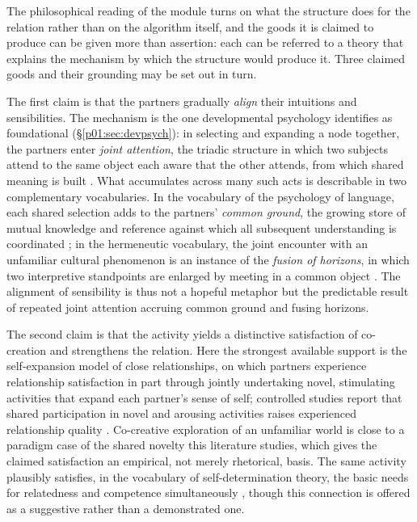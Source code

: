 \documentclass[11pt,a4paper]{article}
\begin{document}
The philosophical reading of the module turns on what the structure does for the relation rather than on the algorithm itself, and the goods it is claimed to produce can be given more than assertion: each can be referred to a theory that explains the mechanism by which the structure would produce it. Three claimed goods and their grounding may be set out in turn.

The first claim is that the partners gradually \emph{align} their intuitions and sensibilities. The mechanism is the one developmental psychology identifies as foundational (§\ref{p01:sec:devpsych}): in selecting and expanding a node together, the partners enter \emph{joint attention}, the triadic structure in which two subjects attend to the same object each aware that the other attends, from which shared meaning is built \parencite{tomasello2005intentions}. What accumulates across many such acts is describable in two complementary vocabularies. In the vocabulary of the psychology of language, each shared selection adds to the partners' \emph{common ground}, the growing store of mutual knowledge and reference against which all subsequent understanding is coordinated \parencite{clark1996using}; in the hermeneutic vocabulary, the joint encounter with an unfamiliar cultural phenomenon is an instance of the \emph{fusion of horizons}, in which two interpretive standpoints are enlarged by meeting in a common object \parencite{gadamer1960truth}. The alignment of sensibility is thus not a hopeful metaphor but the predictable result of repeated joint attention accruing common ground and fusing horizons.

The second claim is that the activity yields a distinctive satisfaction of co-creation and strengthens the relation. Here the strongest available support is the self-expansion model of close relationships, on which partners experience relationship satisfaction in part through jointly undertaking novel, stimulating activities that expand each partner's sense of self; controlled studies report that shared participation in novel and arousing activities raises experienced relationship quality \parencite{aron1986love, aron2000couples}. Co-creative exploration of an unfamiliar world is close to a paradigm case of the shared novelty this literature studies, which gives the claimed satisfaction an empirical, not merely rhetorical, basis. The same activity plausibly satisfies, in the vocabulary of self-determination theory, the basic needs for relatedness and competence simultaneously \parencite{deci2000what}, though this connection is offered as a suggestive rather than a demonstrated one.
\end{document}
